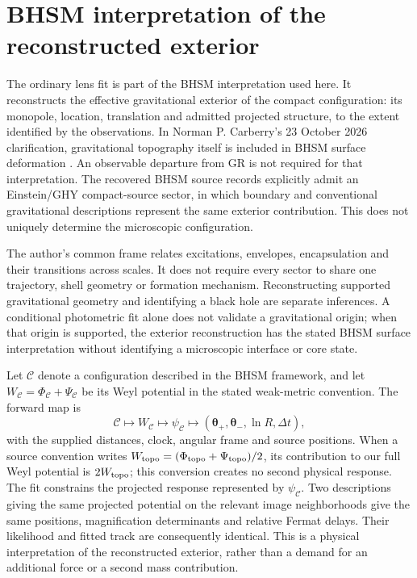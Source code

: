 \section{BHSM interpretation of the reconstructed exterior}
\label{sec:bhsm-interpretation}

The ordinary lens fit is part of the BHSM interpretation used here.
It reconstructs the effective gravitational exterior of the compact
configuration: its monopole, location, translation and admitted projected
structure, to the extent identified by the observations. In Norman P.
Carberry's 23 October 2026 clarification, gravitational topography itself
is included in BHSM surface deformation \cite{CarberrySurfaceGeometry2026}.
An observable departure from GR is not required for that interpretation.
The recovered BHSM source records explicitly admit an
Einstein/GHY compact-source sector, in which boundary and conventional
gravitational descriptions represent the same exterior contribution.
This does not uniquely determine the microscopic configuration.

The author's common frame relates excitations, envelopes, encapsulation
and their transitions across scales. It does not require every sector
to share one trajectory, shell geometry or formation mechanism.
Reconstructing supported gravitational geometry and identifying a black
hole are separate inferences. A conditional photometric fit alone does
not validate a gravitational origin; when that origin is supported, the
exterior reconstruction has the stated BHSM surface interpretation
without identifying a microscopic interface or core state.

Let $\mathcal C$ denote a configuration described in the BHSM framework,
and let $W_{\mathcal C}=\Phi_{\mathcal C}+\Psi_{\mathcal C}$ be its
Weyl potential in the stated weak-metric convention. The forward map is
\begin{equation}
 \mathcal C\longmapsto W_{\mathcal C}
 \longmapsto\psi_{\mathcal C}
 \longmapsto(\boldsymbol\theta_+,\boldsymbol\theta_-,
                  \ln R,\Delta t),
 \label{eq:bhsm-optical-interpretation}
\end{equation}
with the supplied distances, clock, angular frame and source positions.
When a source convention writes
$W_{\rm topo}=(\Phi_{\rm topo}+\Psi_{\rm topo})/2$, its contribution to
our full Weyl potential is $2W_{\rm topo}$; this conversion creates no
second physical response.
The fit constrains the projected response represented by
$\psi_{\mathcal C}$. Two descriptions giving the same projected potential
on the relevant image neighborhoods give the same positions,
magnification determinants and relative Fermat delays. Their likelihood
and fitted track are consequently identical. This is a physical
interpretation of the reconstructed exterior, rather than a demand for
an additional force or a second mass contribution.

